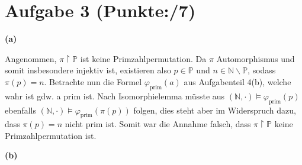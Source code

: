 \documentclass[11pt, a4paper]{article}
\newcommand{\pp}{7}
\begin{document}
\section*{Aufgabe 3 (Punkte:\qquad/\pp)}
\textbf{(a)}
\begin{adjustwidth}{20pt}{20pt}
	Angenommen, $\pi\upharpoonright\mathbb{P}$ ist keine Primzahlpermutation. Da $\pi$ Automorphismus und somit insbesondere injektiv ist, existieren also
	$p \in \mathbb{P}$ und $n \in \mathbb{N}\backslash \mathbb{P}$, sodass $\pi(p)=n$. Betrachte nun die Formel $\varphi_{\text{prim}}(a)$ aus Aufgabenteil 4(b), welche
	wahr ist gdw. a prim ist. Nach Isomorphielemma müsste aus $(\mathbb{N},\cdot) \models \varphi_{\text{prim}}(p)$ ebenfalls
	$(\mathbb{N},\cdot) \models \varphi_{\text{prim}}(\pi(p))$ folgen, dies steht aber im Widerspruch dazu, dass $\pi(p)=n$ nicht prim ist. Somit war die Annahme falsch, dass
	$\pi\upharpoonright\mathbb{P}$ keine Primzahlpermutation ist.
\end{adjustwidth}
\textbf{(b)}
\end{document}
